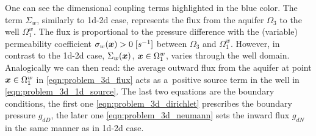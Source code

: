 One can see the dimensional coupling terms highlighted in the blue color.
The term $\Sigma_w$, similarly to 1d-2d case, represents the flux from the aquifer $\Omega_3$ to the well $\Omega^w_1$.
The flux is proportional to the pressure difference with the (variable) permeability coefficient $\sigma_w(\mathbf{\boldsymbol{x}})>0\;[s^{-1}]$ between $\Omega_3$ and $\Omega^w_1$.
However, in contrast to the 1d-2d case, $\Sigma_w(\mathbf{\boldsymbol{x}})$, $\mathbf{\boldsymbol{x}}\in\Omega^w_1$, varies through the well domain.
Analogically we can then read: the average outward flux from the aquifer at point $\mathbf{\boldsymbol{x}}\in\Omega^w_1$
in \eqref{eqn:problem_3d_flux} acts as a~positive source term in the well in \eqref{eqn:problem_3d_1d_source}.
The last two equations are the boundary conditions, the first one \eqref{eqn:problem_3d_dirichlet} prescribes the boundary pressure $g_{dD}$, 
the later one \eqref{eqn:problem_3d_neumann} sets the inward flux $g_{dN}$ in the same manner as in 1d-2d case.

